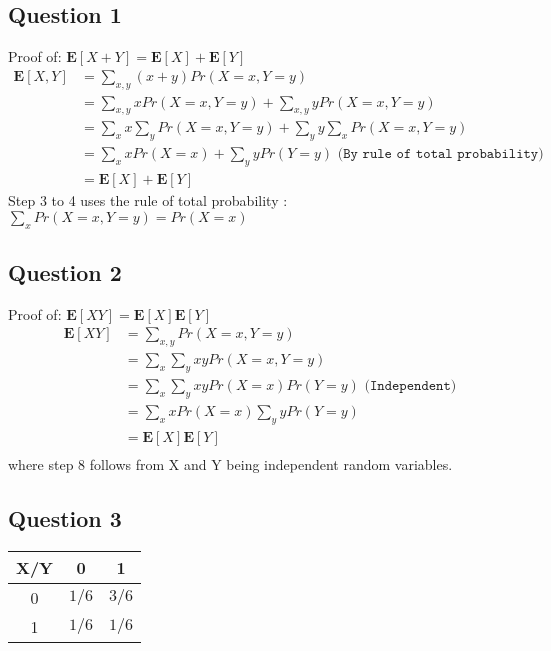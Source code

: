 \documentclass{article}
\begin{document}
\subsection{Question 1}
Proof of: $ \mathbf{E}[X+Y]= \mathbf{E}[X] + \mathbf{E}[Y]$
\begin{align}
\mathbf{E}[X,Y] &= \sum\limits_{x,y}(x+y)Pr(X=x,Y=y) \\
&= \sum\limits_{x,y} x Pr(X=x,Y=y) + \sum\limits_{x,y} y Pr(X=x,Y=y) \\
&= \sum\limits_{x} x \sum\limits_{y} Pr(X=x,Y=y) + \sum\limits_{y} y \sum\limits_{x}  Pr(X=x,Y=y) \\
&= \sum\limits_{x} x Pr(X=x) + \sum\limits_{y} y Pr(Y=y) \texttt{   (By rule of total probability)}\\
&= \mathbf{E}[X] + \mathbf{E}[Y]
\end{align}
Step 3 to 4 uses the rule of total probability : $ \sum\limits_{x} Pr(X=x,Y=y) = Pr(X=x) $
\subsection{Question 2}
Proof of: $ \mathbf{E}[XY]= \mathbf{E}[X] \mathbf{E}[Y]$
\begin{align}
\mathbf{E}[XY] &= \sum\limits_{x,y} Pr(X=x,Y=y) \\
&= \sum\limits_{x}\sum\limits_{y} xy Pr(X=x,Y=y) \\
&= \sum\limits_{x}\sum\limits_{y} xy Pr(X=x)Pr(Y=y) \texttt{  (Independent)} \\
&= \sum\limits_{x}x Pr(X=x)\sum\limits_{y} y Pr (Y=y) \\
&= \mathbf{E}[X] \mathbf{E}[Y] \\
\end{align}
where step 8 follows from X and Y being independent random variables.
\subsection{Question 3}

\begin{table}[H]
  \centering
  \label{tab:table1}
  \begin{tabular}{c||c|c}
    \textsf{X/Y} & 0 & 1 \\
    \hline
    0 & $1/6$ & $3/6$ \\
    1 & $1/6$ & $1/6$\\
  \end{tabular}
\end{table}
\end{document}
